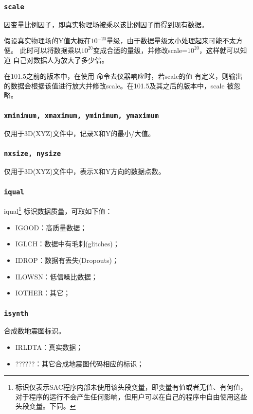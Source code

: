 \subsubsection{\texttt{scale}}
因变量比例因子，即真实物理场被乘以该比例因子而得到现有数据。

假设真实物理场的Y值大概在$10^{-20}$量级，由于数据量级太小处理起来可能不太方便。
此时可以将数据乘以$10^{20}$变成合适的量级，并修改scale=$10^20$，这样就可以知道
自己对数据人为放大了多少倍。

在101.5之前的版本中，在使用  命令去仪器响应时，若scale的值
有定义，则输出的数据会根据该值进行放大并修改scale。在101.5及其之后的版本中，scale
被忽略。

\subsubsection{\texttt{xminimum, xmaximum, yminimum, ymaximum}}
仅用于3D(XYZ)文件中，记录X和Y的最小/大值。

\subsubsection{\texttt{nxsize, nysize}}
仅用于3D(XYZ)文件中，表示X和Y方向的数据点数。

\subsubsection{\texttt{iqual}\dag}
iqual\footnote{\dag 标识仅表示SAC程序内部未使用该头段变量，即变量有值或者无值、有何值，
对于程序的运行不会产生任何影响，但用户可以在自己的程序中自由使用这些头段变量。下同。
}
标识数据质量，可取如下值：
\begin{itemize}
\ttfamily
\item IGOOD：高质量数据；
\item IGLCH：数据中有毛刺(glitches)；
\item IDROP：数据有丢失(Dropouts)；
\item ILOWSN：低信噪比数据；
\item IOTHER：其它；
\end{itemize}

\subsubsection{\texttt{isynth}\dag}
合成数地震图标识。
\begin{itemize}
\ttfamily
\item IRLDTA：真实数据；
\item ??????：其它合成地震图代码相应的标识；
\end{itemize}

